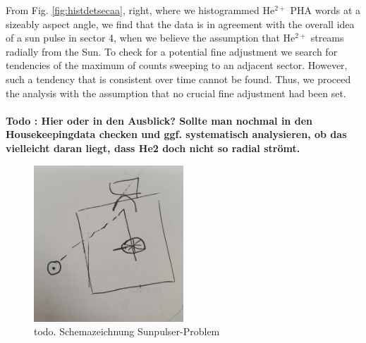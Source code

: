 From Fig. \ref{fig:histdetsecaa}, right, where we histogrammed $\mathrm{He^{2+}}$ PHA words at a sizeably aspect angle, we find that the data is in agreement with the overall idea of a sun pulse in sector 4, when we believe the assumption that $\mathrm{He^{2+}}$ streams radially from the Sun. 
To check for a potential fine adjustment we search for tendencies of the maximum of counts sweeping to an adjacent sector. However, such a tendency that is consistent over time cannot be found. Thus, we proceed the analysis with the assumption that no crucial fine adjustment had been set. 
\\ \\
\textbf{Todo : Hier oder in den Ausblick? Sollte man nochmal in den Housekeepingdata checken und ggf. systematisch analysieren, ob das vielleicht daran liegt, dass He2 doch nicht so radial strömt.}
\\
\begin{figure}[h]
	\includegraphics[width=0.5\textwidth]{Figures/dummy_sunpulse.jpg}
	\centering
	\caption{todo. Schemazeichnung Sunpulser-Problem}
	\label{fig:sp}
\end{figure}
